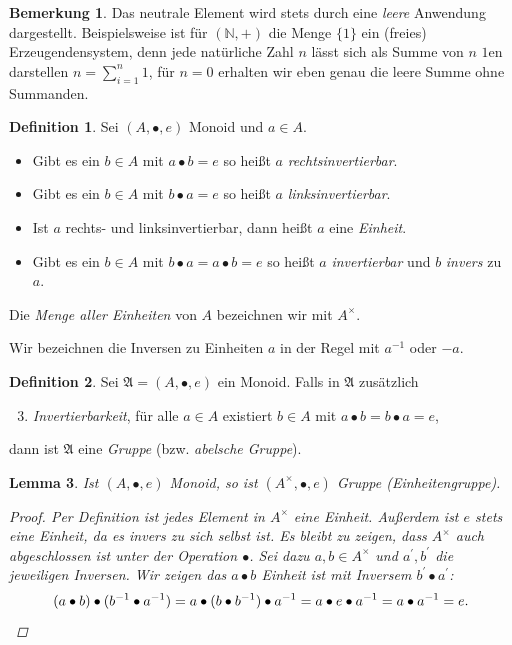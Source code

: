 \documentclass[11pt, a4paper]{article}
\theoremstyle{definition}
\newtheorem{definition}{Definition}[section]
\newtheorem*{remark*}{Bemerkung}
\theoremstyle{plain}
\newtheorem{lemma}[definition]{Lemma}
\numberwithin{equation}{section}
\begin{document}
\begin{remark*}
	Das neutrale Element wird stets durch eine \textit{leere} Anwendung dargestellt. Beispielsweise ist für \( (\mathbb{N}, +) \) die Menge \( \{1\} \) ein (freies) Erzeugendensystem, denn jede natürliche Zahl \( n \) lässt sich als Summe von \( n \) \( 1 \)en darstellen \( n = \sum_{i=1}^n 1 \), für \( n = 0 \) erhalten wir eben genau die leere Summe ohne Summanden.
\end{remark*}
\begin{definition}
	Sei \( (A, \bullet, e) \) Monoid und \( a \in A \).
	\begin{itemize}
		\item Gibt es ein \( b \in A \) mit \( a \bullet b = e \) so heißt \( a \) \textit{rechtsinvertierbar}.
		\item Gibt es ein \( b \in A \) mit \( b \bullet a = e \) so heißt \( a \) \textit{linksinvertierbar}.
		\item Ist \( a \) rechts- und linksinvertierbar, dann heißt \( a \) eine \textit{Einheit}.
		\item Gibt es ein \( b \in A \) mit \( b \bullet a = a \bullet b = e \) so heißt \( a \) \textit{invertierbar} und \( b \) \textit{invers} zu \( a \). 
	\end{itemize}
	Die \textit{Menge aller Einheiten} von \( A \) bezeichnen wir mit \( A^\times \).
\end{definition}
Wir bezeichnen die Inversen zu Einheiten \( a \) in der Regel mit \( a^{-1} \) oder \( -a \). 
\begin{definition}
	Sei \( \mathfrak{A} = (A, \bullet, e) \) ein Monoid. Falls in \( \mathfrak{A} \) zusätzlich
	\begin{enumerate}\setcounter{enumi}{2}
		\item \textit{Invertierbarkeit}, für alle \( a \in A \) existiert \( b \in A \) mit \( a \bullet b = b \bullet a = e \), 
	\end{enumerate}
	dann ist \( \mathfrak{A} \) eine \textit{Gruppe} (bzw. \textit{abelsche Gruppe}).
\end{definition}
\begin{lemma}
	Ist \( (A, \bullet, e) \) Monoid, so ist \( (A^\times, \bullet, e) \) Gruppe (Einheitengruppe).
	\begin{proof}
		Per Definition ist jedes Element in \( A^\times \) eine Einheit. Außerdem ist \( e \) stets eine Einheit, da es invers zu sich selbst ist. Es bleibt zu zeigen, dass \( A^\times \) auch abgeschlossen ist unter der Operation \( \bullet \). Sei dazu \( a, b \in A^\times \) und \( a^\prime, b^\prime \) die jeweiligen Inversen. Wir zeigen das \( a \bullet b \) Einheit ist mit Inversem \( b^\prime \bullet a^\prime \):
		\[
			(a \bullet b) \bullet (b^{-1} \bullet a^{-1}) = a \bullet (b \bullet b^{-1}) \bullet a^{-1} = a \bullet e \bullet a^{-1} = a \bullet a^{-1} = e. \qedhere
		\]
	\end{proof}
\end{lemma}
\end{document}
